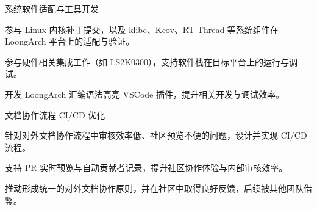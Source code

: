 \begin{cventries}
\cventry
  {} %
  {系统软件适配与工具开发} %
  {} %
  {} %
  {
    \begin{cvitems}
      \item {参与 Linux 内核补丁提交，以及 klibc、Kcov、RT-Thread 等系统组件在 LoongArch 平台上的适配与验证。}
      \item {参与硬件相关集成工作（如 LS2K0300），支持软件栈在目标平台上的运行与调试。}
      \item {开发 LoongArch 汇编语法高亮 VSCode 插件，提升相关开发与调试效率。}
    \end{cvitems}
  }

\cventry
  {} %
  {文档协作流程 CI/CD 优化} %
  {} %
  {} %
  {
    \begin{cvitems}
      \item {针对对外文档协作流程中审核效率低、社区预览不便的问题，设计并实现 CI/CD 流程。}
      \item {支持 PR 实时预览与自动贡献者记录，提升社区协作体验与内部审核效率。}
      \item {推动形成统一的对外文档协作原则，并在社区中取得良好反馈，后续被其他团队借鉴。}
    \end{cvitems}
  }
\end{cventries}
